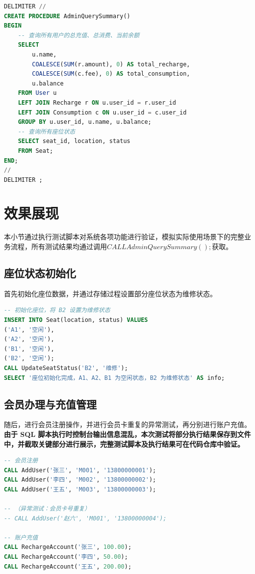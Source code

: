 \documentclass[12pt,a4paper]{article}
\begin{document}
\begin{lstlisting}[language=SQL,caption={管理员汇总查询功能}]
DELIMITER //
CREATE PROCEDURE AdminQuerySummary()
BEGIN
    -- 查询所有用户的总充值、总消费、当前余额
    SELECT 
        u.name,
        COALESCE(SUM(r.amount), 0) AS total_recharge,
        COALESCE(SUM(c.fee), 0) AS total_consumption,
        u.balance
    FROM User u
    LEFT JOIN Recharge r ON u.user_id = r.user_id
    LEFT JOIN Consumption c ON u.user_id = c.user_id
    GROUP BY u.user_id, u.name, u.balance;
    -- 查询所有座位状态
    SELECT seat_id, location, status
    FROM Seat;
END;
//
DELIMITER ;
\end{lstlisting}

\section{效果展现}
本小节通过执行测试脚本对系统各项功能进行验证，模拟实际使用场景下的完整业务流程，所有测试结果均通过调用$CALL AdminQuerySummary();$获取。

\subsection{座位状态初始化}
首先初始化座位数据，并通过存储过程设置部分座位状态为维修状态。
\begin{lstlisting}[language=SQL,caption={座位状态初始化}]
-- 初始化座位，将 B2 设置为维修状态
INSERT INTO Seat(location, status) VALUES
('A1', '空闲'),
('A2', '空闲'),
('B1', '空闲'),
('B2', '空闲');
CALL UpdateSeatStatus('B2', '维修');
SELECT '座位初始化完成，A1、A2、B1 为空闲状态，B2 为维修状态' AS info;
\end{lstlisting}

\subsection{会员办理与充值管理}
随后，进行会员注册操作，并进行会员卡重复的异常测试，再分别进行账户充值。
\textbf{由于 SQL 脚本执行时控制台输出信息混乱，本次测试将部分执行结果保存到文件中，并截取关键部分进行展示，完整测试脚本及执行结果可在代码仓库中验证。}
\begin{lstlisting}[language=SQL,caption={会员办理与充值管理}]
-- 会员注册 
CALL AddUser('张三', 'M001', '13800000001');
CALL AddUser('李四', 'M002', '13800000002');
CALL AddUser('王五', 'M003', '13800000003');

-- （异常测试：会员卡号重复）
-- CALL AddUser('赵六', 'M001', '13800000004');

-- 账户充值 
CALL RechargeAccount('张三', 100.00);
CALL RechargeAccount('李四', 50.00);
CALL RechargeAccount('王五', 200.00);
\end{lstlisting}
\end{document}
